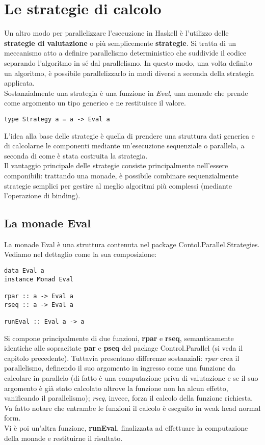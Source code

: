 \section{Le strategie di calcolo}
Un altro modo per parallelizzare l'esecuzione in Haskell è l'utilizzo delle \textbf{strategie di valutazione} o più semplicemente \textbf{strategie}. Si tratta di un meccanismo atto a definire parallelismo deterministico che suddivide il codice separando l'algoritmo in sé dal parallelismo. In questo modo, una volta definito un algoritmo, è possibile parallelizzarlo in modi diversi a seconda della strategia applicata.\\
Sostanzialmente una strategia è una funzione in \textit{Eval}, una monade che prende come argomento un tipo generico e ne restituisce il valore.
\begin{verbatim}
type Strategy a = a -> Eval a
\end{verbatim}
L'idea alla base delle strategie è quella di prendere una struttura dati generica e di calcolarne le componenti mediante un'esecuzione sequenziale o parallela, a seconda di come è stata costruita la strategia.\\
Il vantaggio principale delle strategie consiste principalmente nell'essere componibili: trattando una monade, è possibile combinare sequenzialmente strategie semplici per gestire al meglio algoritmi più complessi (mediante l'operazione di binding).
\subsection{La monade Eval}
La monade Eval è una struttura contenuta nel package Contol.Parallel.Strategies. Vediamo nel dettaglio come la sua composizione:
\begin{verbatim}
data Eval a
instance Monad Eval

rpar :: a -> Eval a
rseq :: a -> Eval a

runEval :: Eval a -> a
\end{verbatim}
Si compone principalmente di due funzioni, \textbf{rpar} e \textbf{rseq}, semanticamente identiche alle sopracitate \textbf{par} e \textbf{pseq} del package Control.Parallel (si veda il capitolo precedente). Tuttavia presentano differenze sostanziali: \textit{rpar} crea il parallelismo, definendo il suo argomento in ingresso come una funzione da calcolare in parallelo (di fatto è una computazione priva di valutazione e se il suo argomento è già stato calcolato altrove la funzione non ha alcun effetto, vanificando il parallelismo); \textit{rseq}, invece, forza il calcolo della funzione richiesta. Va fatto notare che entrambe le funzioni il calcolo è eseguito in  weak head normal form.\\
Vi è poi un'altra funzione, \textbf{runEval}, finalizzata ad effettuare la computazione della monade e restituirne il risultato.
